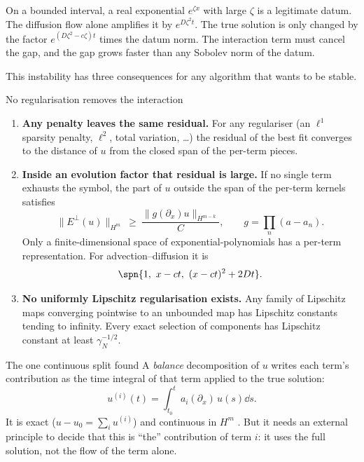 \begin{intuition}
On a bounded interval, a real exponential $e^{\zeta x}$ with large $\zeta$ is a legitimate datum. The diffusion flow alone amplifies it by $e^{D\zeta^2t}$. The true solution is only changed by the factor $e^{(D\zeta^2-c\zeta)t}$ times the datum norm. The interaction term must cancel the gap, and the gap grows faster than any Sobolev norm of the datum.
\end{intuition}

This instability has three consequences for any algorithm that wants to be stable.

\begin{theorem}{No regularisation removes the interaction  \proved}\label{thm:noreg}
\begin{enumerate}[label=(\alph*)]
\item \textbf{Any penalty leaves the same residual.} For any regulariser (an $\ell^1$ sparsity penalty, $\ell^2$, total variation, \dots) the residual of the best fit converges to the distance of $u$ from the closed span of the per-term pieces.
\item \textbf{Inside an evolution factor that residual is large.} If no single term exhausts the symbol, the part of $u$ outside the span of the per-term kernels satisfies
\[
\|E^\perp(u)\|_{H^m}\ \ge\ \frac{\|g(\partial_x)u\|_{H^{m-k}}}{C},\qquad g=\prod_n(a-a_n).
\]
Only a finite-dimensional space of exponential-polynomials has a per-term representation. For advection--diffusion it is
\[
\spn\{1,\ x-ct,\ (x-ct)^2+2Dt\}.
\]
\item \textbf{No uniformly Lipschitz regularisation exists.} Any family of Lipschitz maps converging pointwise to an unbounded map has Lipschitz constants tending to infinity. Every exact selection of components has Lipschitz constant at least $\gamma_N^{-1/2}$.
\end{enumerate}
\end{theorem}

\begin{aside}{The one continuous split found}
A \emph{balance} decomposition of $u$ writes each term's contribution as the time integral of that term applied to the true solution:
\[
u^{(i)}(t)=\int_{t_0}^{t}a_i(\partial_x)\,u(s)\dd s .
\]
It is exact ($u-u_0=\sum_iu^{(i)}$) and continuous in $H^m$  \pw. But it needs an external principle to decide that this is ``the'' contribution of term $i$: it uses the full solution, not the flow of the term alone.
\end{aside}


